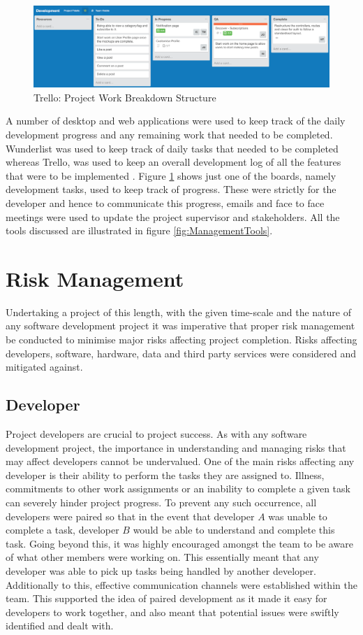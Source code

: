 \begin{figure}[H]
	\centering
	\includegraphics[width=1.0\textwidth]{Images/ProjectManagement/Trello}
	\caption{Trello: Project Work Breakdown Structure} \label{fig:Trello_WBS}
\end{figure}

A number of desktop and web applications were used to keep track of the daily development progress and any remaining work that needed to be completed. Wunderlist was used to keep track of daily tasks that needed to be completed whereas Trello, was used to keep an overall development log of all the features that were to be implemented \cite{Wunderlist:Home, Trello:Home}. Figure \ref{fig:Trello_WBS} shows just one of the boards, namely development tasks, used to keep track of progress. These were strictly for the developer and hence to communicate this progress, emails and face to face meetings were used to update the project supervisor and stakeholders. All the tools discussed are illustrated in figure \ref{fig:ManagementTools}.

\section{Risk Management}
Undertaking a project of this length, with the given time-scale and the nature of any software development project it was imperative that proper risk management be conducted to minimise major risks affecting project completion. Risks affecting developers, software, hardware, data and third party services were considered and mitigated against.

\subsection{Developer}
Project developers are crucial to project success. As with any software development project, the importance in understanding and managing risks that may affect developers cannot be undervalued. One of the main risks affecting any developer is their ability to perform the tasks they are assigned to. Illness, commitments to other work assignments or an inability to complete a given task can severely hinder project progress. To prevent any such occurrence, all developers were paired so that in the event that developer $A$ was unable to complete a task, developer $B$ would be able to understand and complete this task. Going beyond this, it was highly encouraged amongst the team to be aware of what other members were working on. This essentially meant that any developer was able to pick up tasks being handled by another developer. Additionally to this, effective communication channels were established within the team. This supported the idea of paired development as it made it easy for developers to work together, and also meant that potential issues were swiftly identified and dealt with.

